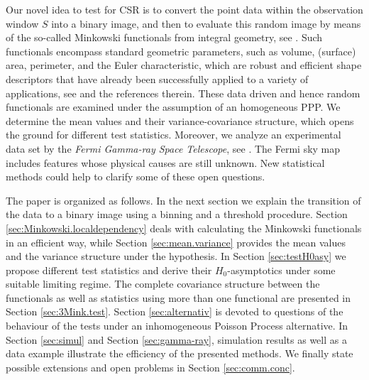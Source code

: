 \documentclass[12pt]{article}
\begin{document}
Our novel idea to test for CSR  is to convert the point data within the observation window $S$ into a binary image,
and then to evaluate this random image by means of the so-called Minkowski functionals from integral geometry, see \cite{19}. Such functionals encompass standard geometric parameters, such as volume, (surface) area, perimeter, and the Euler characteristic, which are robust and efficient shape descriptors that have already been successfully applied to a variety of applications, see \cite{43,44} and the references therein. These data driven and hence random functionals are examined under the assumption of an homogeneous PPP. We determine the mean values and their variance-covariance structure, which opens the ground for different test statistics. Moreover, we analyze an experimental data set by the {\em Fermi Gamma-ray Space Telescope}, see \cite{AceroEtAl2015}. The Fermi sky map includes features whose physical causes are still unknown. New statistical methods could help to clarify some of these open questions.

The paper is organized as follows. In the next section we explain the transition of the data to a binary image using a binning and a threshold procedure. Section \ref{sec:Minkowski.localdependency} deals with calculating the Minkowski functionals in an efficient way, while Section \ref{sec:mean.variance} provides the mean values and the variance structure under the hypothesis. In Section \ref{sec:testH0asy} we propose different test statistics and derive their $H_0$-asymptotics under some suitable limiting regime. The complete covariance structure between the functionals as well as statistics using more than one functional are presented in Section \ref{sec:3Mink.test}. Section \ref{sec:alternativ} is devoted to questions of the behaviour of the tests under an inhomogeneous Poisson Process alternative. In Section \ref{sec:simul} and Section \ref{sec:gamma-ray}, simulation results as well as a data example illustrate the efficiency of the presented methods. We finally state possible extensions and open problems in Section \ref{sec:comm.conc}.







\end{document}
